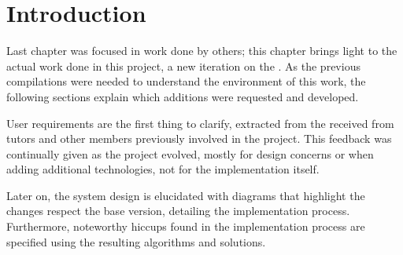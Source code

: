 \section{Introduction} %
\label{sec:intro3}

Last chapter was focused in work done by others; this chapter brings light to the actual work done in this project, a new iteration on the .
As the previous compilations were needed to understand the environment of this work, the following sections explain which additions were requested and developed.

User requirements are the first thing to clarify, extracted from the received from tutors and other  members previously involved in the project.
This feedback was continually given as the project evolved, mostly for design concerns or when adding additional technologies, not for the implementation itself.

Later on, the system design is elucidated with diagrams that highlight the changes respect the base version, detailing the implementation process.
Furthermore, noteworthy hiccups found in the implementation process are specified using the resulting algorithms and solutions.


